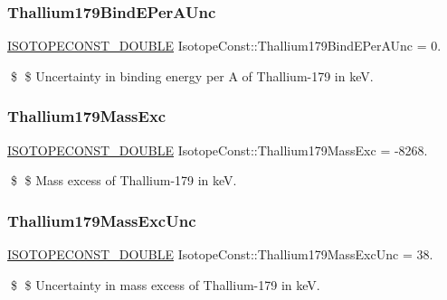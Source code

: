 \subsubsection{\texorpdfstring{Thallium179\+Bind\+E\+Per\+A\+Unc}{Thallium179BindEPerAUnc}}
{\footnotesize\ttfamily \mbox{\hyperlink{group___isotope_const-_macros_ga8f45a7272ce02c0b4c65c44636ed719a}{I\+S\+O\+T\+O\+P\+E\+C\+O\+N\+S\+T\+\_\+\+D\+O\+U\+B\+LE}} Isotope\+Const\+::\+Thallium179\+Bind\+E\+Per\+A\+Unc = 0.}

\$ \$ Uncertainty in binding energy per A of Thallium-\/179 in keV. \mbox{\label{group___isotope_const-_thallium-_tl179_gadc7b3519f4ce526ba3e7ae26bafd9688}} 
\subsubsection{\texorpdfstring{Thallium179\+Mass\+Exc}{Thallium179MassExc}}
{\footnotesize\ttfamily \mbox{\hyperlink{group___isotope_const-_macros_ga8f45a7272ce02c0b4c65c44636ed719a}{I\+S\+O\+T\+O\+P\+E\+C\+O\+N\+S\+T\+\_\+\+D\+O\+U\+B\+LE}} Isotope\+Const\+::\+Thallium179\+Mass\+Exc = -\/8268.}

\$ \$ Mass excess of Thallium-\/179 in keV. \mbox{\label{group___isotope_const-_thallium-_tl179_ga71c11f1983d6816bf35c535792132253}} 
\subsubsection{\texorpdfstring{Thallium179\+Mass\+Exc\+Unc}{Thallium179MassExcUnc}}
{\footnotesize\ttfamily \mbox{\hyperlink{group___isotope_const-_macros_ga8f45a7272ce02c0b4c65c44636ed719a}{I\+S\+O\+T\+O\+P\+E\+C\+O\+N\+S\+T\+\_\+\+D\+O\+U\+B\+LE}} Isotope\+Const\+::\+Thallium179\+Mass\+Exc\+Unc = 38.}

\$ \$ Uncertainty in mass excess of Thallium-\/179 in keV. \mbox{\label{group___isotope_const-_thallium-_tl179_ga23b7e46328587b03431523715c2c56d5}} 
